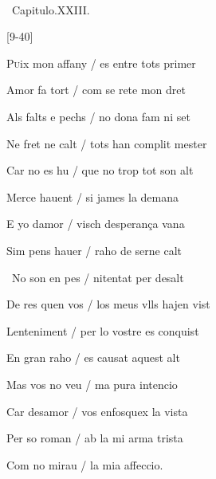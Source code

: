\documentclass[12pt]{article}
\renewcommand{\espaiAbansEtiquetaPoema}{\vspace{0ex}}
\begin{document}
\begin{estrofa}

\espaiAbansEtiquetaPoema

\\

\begin{rubrica}

\pagina{[40v]} \textparagraph\  Capitulo.XXIII.

\end{rubrica}

\end{estrofa}




\begin{estrofaBuida}


\end{estrofaBuida}


\begin{estrofaExtra}%




\begin{Versos}

[9-40]

\end{Versos}


\end{estrofaExtra}


\begin{estrofa}

 P\textsc{u}ix mon affany / es entre tots primer

 Amor fa tort / com se rete mon dret

 Als falts e pechs / no dona fam ni set

 Ne fret ne calt / tots han complit mester

 Car no es hu / que no trop tot son alt

 Merce hauent / si james la demana

 E yo damor / visch desperan\c{c}a vana

 Sim pens hauer / raho de serne calt

\end{estrofa}



\begin{estrofa}

 \textparagraph\  No son en pes / nitentat per desalt

 De res quen vos / los meus vlls hajen vist

 Lenteniment / per lo vostre es conquist

 En gran raho / es causat aquest alt

 Mas vos no veu / ma pura intencio

 Car desamor / vos enfosquex la vista

 Per so roman / ab la mi arma trista

 Com no mirau / la mia affeccio.

\end{estrofa}
\end{document}
